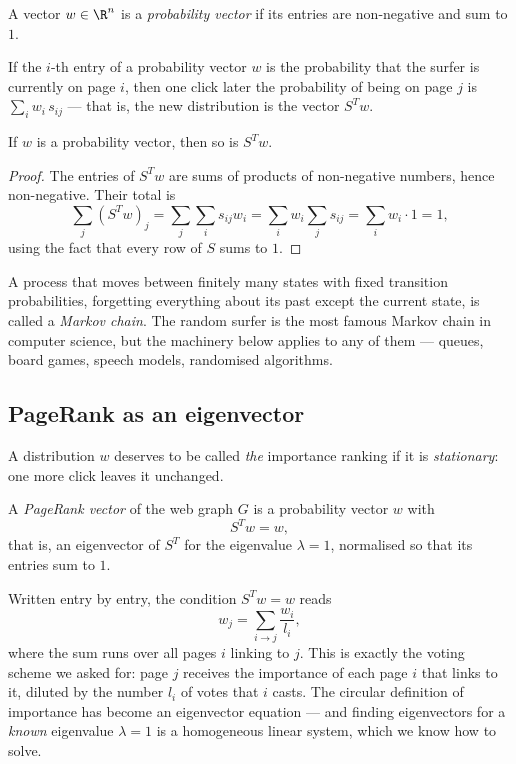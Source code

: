 \begin{definition}
A vector $w\in\R^n$ is a \emph{probability vector} if its entries are non-negative and sum to $1$.
\end{definition}

If the $i$-th entry of a probability vector $w$ is the probability that the surfer is currently on page
$i$, then one click later the probability of being on page $j$ is $\sum_i w_i\, s_{ij}$ — that is, the
new distribution is the vector $S^T w$.

\begin{fact}
If $w$ is a probability vector, then so is $S^T w$.
\end{fact}

\begin{proof}
The entries of $S^T w$ are sums of products of non-negative numbers, hence non-negative. Their total is
\[
\sum_{j} (S^T w)_j = \sum_j \sum_i s_{ij} w_i = \sum_i w_i \sum_j s_{ij} = \sum_i w_i \cdot 1 = 1,
\]
using the fact that every row of $S$ sums to $1$.
\end{proof}

\begin{remark}
A process that moves between finitely many states with fixed transition probabilities, forgetting
everything about its past except the current state, is called a \emph{Markov chain}. The random surfer is
the most famous Markov chain in computer science, but the machinery below applies to any of them —
queues, board games, speech models, randomised algorithms.
\end{remark}

\subsection{PageRank as an eigenvector}

A distribution $w$ deserves to be called \emph{the} importance ranking if it is \emph{stationary}: one
more click leaves it unchanged.

\begin{definition}
A \emph{PageRank vector} of the web graph $G$ is a probability vector $w$ with
\[
S^T w = w,
\]
that is, an eigenvector of $S^T$ for the eigenvalue $\lambda = 1$, normalised so that its entries sum to
$1$.
\end{definition}

Written entry by entry, the condition $S^T w = w$ reads
\[
w_j = \sum_{i\to j} \frac{w_i}{l_i},
\]
where the sum runs over all pages $i$ linking to $j$. This is exactly the voting scheme we asked for:
page $j$ receives the importance of each page $i$ that links to it, diluted by the number $l_i$ of votes
that $i$ casts. The circular definition of importance has become an eigenvector equation — and finding
eigenvectors for a \emph{known} eigenvalue $\lambda = 1$ is a homogeneous linear system, which we know how
to solve.

